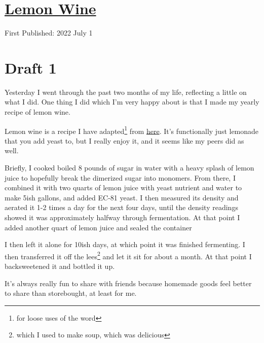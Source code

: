 \documentclass[12pt]{article}[titlepage]
\newcommand{\1}{\={a}}
\newcommand{\2}{\={e}}
\newcommand{\3}{\={\i}}
\newcommand{\4}{\=o}
\newcommand{\5}{\=u}
\newcommand{\6}{\={A}}
\renewcommand{\,}{\textsuperscript{,}}
\begin{document}
\doublespacing
\section{\href{lemon-wine.html}{Lemon Wine}}
First Published: 2022 July 1


\section{Draft 1}
Yesterday I went through the past two months of my life, reflecting a little on what I did.
One thing I did which I'm very happy about is that I made my yearly recipe of lemon wine.

Lemon wine is a recipe I have adapted\footnote{for loose uses of the word} from \href{skeeterpee.com}{here}.
It's functionally just lemonade that you add yeast to, but I really enjoy it, and it seems like my peers did as well.

Briefly, I cooked boiled 8 pounds of sugar in water with a heavy splash of lemon juice to hopefully break the dimerized sugar into monomers.
From there, I combined it with two quarts of lemon juice with yeast nutrient and water to make 5ish gallons, and added EC-81 yeast.
I then measured its density and aerated it 1-2 times a day for the next four days, until the density readings showed it was approximately halfway through fermentation.
At that point I added another quart of lemon juice and sealed the container

I then left it alone for 10ish days, at which point it was finished fermenting.
I then transferred it off the lees\footnote{which I used to make soup, which was delicious} and let it sit for about a month.
At that point I backsweetened it and bottled it up.

It's always really fun to share with friends because homemade goods feel better to share than storebought, at least for me.
\end{document}
